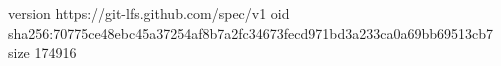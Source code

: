 version https://git-lfs.github.com/spec/v1
oid sha256:70775ce48ebc45a37254af8b7a2fc34673fecd971bd3a233ca0a69bb69513cb7
size 174916
